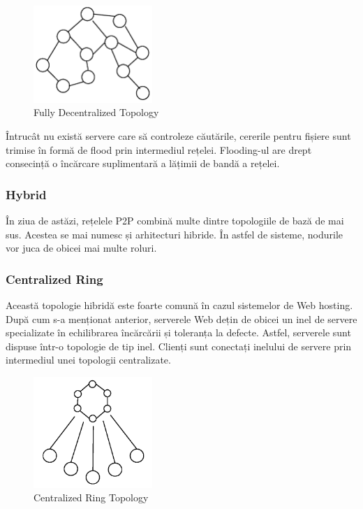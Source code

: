 \begin{figure}
  \centering
  \includegraphics[width=0.4\textwidth]{src/img/p2p-systems/decentralized}
  \caption{Fully Decentralized Topology}
  \label{fig:p2p-systems:decentralized}
\end{figure}

Întrucât nu există servere care să controleze căutările, cererile pentru
fișiere sunt trimise în formă de flood prin intermediul rețelei. Flooding-ul
are drept consecință o încărcare suplimentară a lățimii de bandă a rețelei.

\subsubsection{Hybrid}

În ziua de astăzi, rețelele P2P combină multe dintre topologiile de bază de
mai sus. Acestea se mai numesc și arhitecturi hibride. În astfel de sisteme,
nodurile vor juca de obicei mai multe roluri.

\subsubsection{Centralized Ring}

Această topologie hibridă este foarte comună în cazul sistemelor de Web
hosting. După cum s-a menționat anterior, serverele Web dețin de obicei un
inel de servere specializate în echilibrarea încărcării și toleranța la
defecte. Astfel, serverele sunt dispuse într-o topologie de tip inel. Clienți
sunt conectați inelului de servere prin intermediul unei topologii
centralizate.

\begin{figure}
  \centering
  \includegraphics[width=0.4\textwidth]{src/img/p2p-systems/centralized-ring}
  \caption{Centralized Ring Topology}
  \label{fig:p2p-systems:centralized-ring}
\end{figure}

